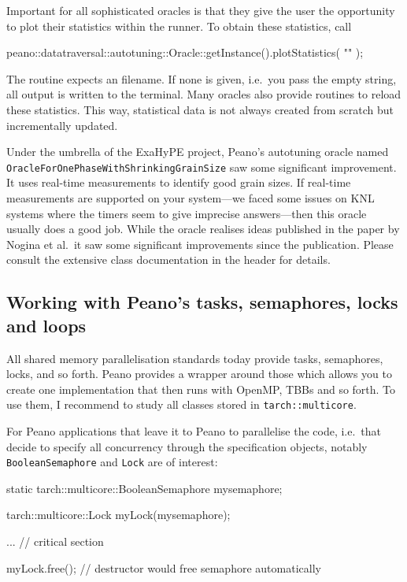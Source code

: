 Important for all sophisticated oracles is that they give the user the
opportunity to plot their statistics within the runner. 
To obtain these statistics, call
\begin{code}
  peano::datatraversal::autotuning::Oracle::getInstance().plotStatistics( "" );
\end{code}
The routine expects an filename.
If none is given, i.e.~you pass the empty string, all output is written to the
terminal.
Many oracles also provide routines to reload these statistics.
This way, statistical data is not always created from scratch but incrementally
updated.


\begin{remark}
 Under the umbrella of the ExaHyPE project, Peano's autotuning oracle named
 \texttt{OracleForOnePhaseWithShrinkingGrainSize} saw some significant
 improvement. It uses real-time measurements to identify good grain sizes. 
 If real-time measurements are supported on your system---we faced some issues
 on KNL systems where the timers seem to give imprecise answers---then this
 oracle usually does a good job. While the oracle realises ideas published in
 the paper by Nogina et al.~it saw some significant improvements since the
 publication. Please consult the extensive class documentation in the header for
 details.
\end{remark}



\subsection{Working with Peano's tasks, semaphores, locks and loops}
\label{section:51_shared-memory:tasks}


All shared memory parallelisation standards today provide tasks, semaphores,
locks, and so forth.
Peano provides a wrapper around those which allows you to create one
implementation that then runs with OpenMP, TBBs and so forth.
To use them, I recommend to study all classes stored in
\texttt{tarch::multicore}.


For Peano applications that leave it to Peano to parallelise the code, 
i.e.~that decide to specify all concurrency through the specification 
objects, notably \texttt{BooleanSemaphore} and \texttt{Lock} are of interest:

\begin{code}
  static tarch::multicore::BooleanSemaphore  mysemaphore;
  
  
  tarch::multicore::Lock   myLock(mysemaphore);
  
  ...            // critical section
  
  myLock.free(); // destructor would free semaphore automatically
\end{code}



